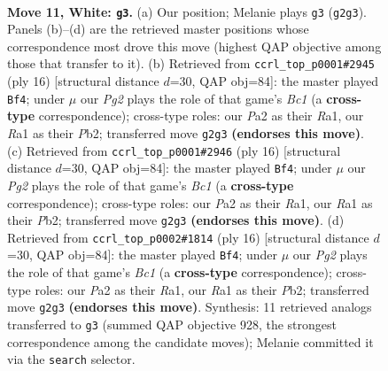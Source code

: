\documentclass[11pt]{article}
\begin{document}
\clearpage

\begin{figure}[p]\centering
\begin{subfigure}{0.46\textwidth}\centering
\resizebox{\linewidth}{!}{%
\newchessgame
\chessboard[
  setfen={r1bqk2r/1p3pp1/4pn2/p1b4p/7P/1P1B1N2/P1P2PP1/R1BQK2R w KQkq - 0 11},
  showmover=false,
  pgfstyle=straightmove, color=movearrow, markmove={g2-g3}
]}
\caption{}
\end{subfigure}\hfill
\begin{subfigure}{0.46\textwidth}\centering
\resizebox{\linewidth}{!}{%
\newchessgame
\chessboard[
  setfen={r1bqk2r/pp3ppp/4pn2/2b5/8/3B1N2/PPP2PPP/R1BQK2R w KQkq - 0 9},
  showmover=false,
  pgfstyle=straightmove, color=movearrow, markmove={c1-f4}
]}
\caption{}
\end{subfigure}
\\[4pt]
\begin{subfigure}{0.46\textwidth}\centering
\resizebox{\linewidth}{!}{%
\newchessgame
\chessboard[
  setfen={r1bqk2r/pp3ppp/4pn2/2b5/8/3B1N2/PPP2PPP/R1BQK2R w KQkq - 0 9},
  showmover=false,
  pgfstyle=straightmove, color=movearrow, markmove={c1-f4}
]}
\caption{}
\end{subfigure}\hfill
\begin{subfigure}{0.46\textwidth}\centering
\resizebox{\linewidth}{!}{%
\newchessgame
\chessboard[
  setfen={r1bqk2r/pp3ppp/4pn2/2b5/8/3B1N2/PPP2PPP/R1BQK2R w KQkq - 0 9},
  showmover=false,
  pgfstyle=straightmove, color=movearrow, markmove={c1-f4}
]}
\caption{}
\end{subfigure}
\caption{\textbf{Move 11, White: \texttt{g3}.} (a) Our position; Melanie plays \texttt{g3} (\texttt{g2g3}). Panels (b)--(d) are the retrieved master positions whose correspondence most drove this move (highest QAP objective among those that transfer to it). (b) Retrieved from \texttt{ccrl\_top\_p0001\#2945} (ply 16) [structural distance $d$=30, QAP obj=84]: the master played \texttt{Bf4}; under $\mu$ our \emph{Pg2} plays the role of that game's \emph{Bc1} (a \textbf{cross-type} correspondence); cross-type roles: our \emph{P}a2 as their \emph{R}a1, our \emph{R}a1 as their \emph{P}b2; transferred move \texttt{g2g3} \textbf{(endorses this move)}. (c) Retrieved from \texttt{ccrl\_top\_p0001\#2946} (ply 16) [structural distance $d$=30, QAP obj=84]: the master played \texttt{Bf4}; under $\mu$ our \emph{Pg2} plays the role of that game's \emph{Bc1} (a \textbf{cross-type} correspondence); cross-type roles: our \emph{P}a2 as their \emph{R}a1, our \emph{R}a1 as their \emph{P}b2; transferred move \texttt{g2g3} \textbf{(endorses this move)}. (d) Retrieved from \texttt{ccrl\_top\_p0002\#1814} (ply 16) [structural distance $d$=30, QAP obj=84]: the master played \texttt{Bf4}; under $\mu$ our \emph{Pg2} plays the role of that game's \emph{Bc1} (a \textbf{cross-type} correspondence); cross-type roles: our \emph{P}a2 as their \emph{R}a1, our \emph{R}a1 as their \emph{P}b2; transferred move \texttt{g2g3} \textbf{(endorses this move)}. Synthesis: 11 retrieved analogs transferred to \texttt{g3} (summed QAP objective 928, the strongest correspondence among the candidate moves); Melanie committed it via the \texttt{search} selector.}
\label{fig:thought-m20}
\end{figure}
\end{document}
